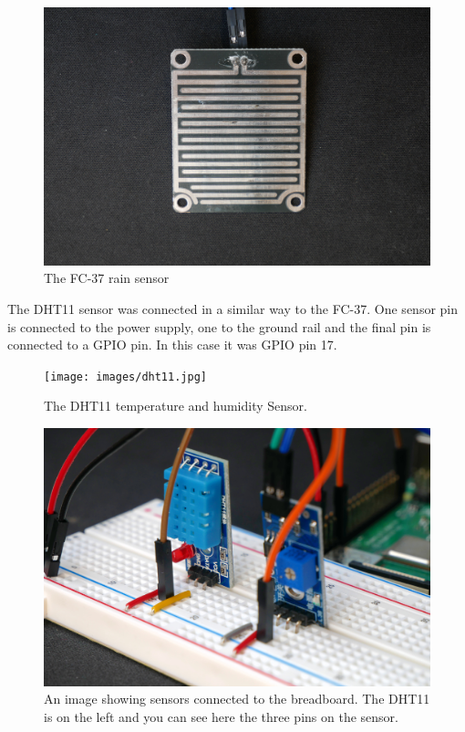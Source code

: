 \documentclass[10pt,a4paper]{article}
\begin{document}
\begin{figure}[H]
  \centering
    \includegraphics[width=\linewidth]{images/rainPanel.jpg}
    \caption{The FC-37 rain sensor}
    \label{fig:rain panel}
\end{figure}

The DHT11 sensor was connected in a similar way to the FC-37. One sensor pin is connected to the power supply, one to the ground rail and the final pin is connected to a GPIO pin. In this case it was GPIO pin 17. 

\begin{figure}[H]
  \centering
    \texttt{[image: images/dht11.jpg]}
    \caption{The DHT11 temperature and humidity Sensor.}
    \label{fig:dht11}
\end{figure}

\begin{figure}[H]
  \centering
    \includegraphics[width=\linewidth]{images/sensorCloseup.jpg}
    \caption{An image showing sensors connected to the breadboard. The DHT11 is on the left and you can see here the three pins on the sensor.}
    \label{fig:piCam}
\end{figure}
\end{document}
